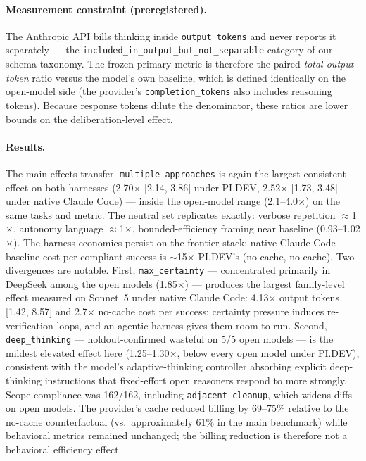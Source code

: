 \documentclass[11pt]{article}
\newcommand{\pidev}{PI.DEV}
\newcommand{\cc}{Claude Code}
\newcommand{\xd}{$\times$}
\begin{document}
\paragraph{Measurement constraint (preregistered).} The Anthropic API
bills thinking inside \texttt{output\_tokens} and never reports it
separately --- the \texttt{included\_in\_output\_but\_not\_separable}
category of our schema taxonomy. The frozen primary metric is therefore
the paired \emph{total-output-token} ratio versus the model's own
baseline, which is defined identically on the open-model side (the
provider's \texttt{completion\_tokens} also includes reasoning tokens).
Because response tokens dilute the denominator, these ratios are lower
bounds on the deliberation-level effect.

\paragraph{Results.} The main effects transfer. \texttt{multiple\_approaches}
is again the largest consistent effect on both harnesses (2.70\xd{} [2.14, 3.86]
under \pidev, 2.52\xd{} [1.73, 3.48] under native \cc) --- inside the
open-model range (2.1--4.0\xd) on the same tasks and metric. The neutral
set replicates exactly: verbose repetition $\approx$1\xd, autonomy
language $\approx$1\xd, bounded-efficiency framing near baseline (0.93--1.02\xd).
The harness economics persist on the frontier stack: native-\cc{} baseline
cost per compliant success is $\sim$15\xd{} \pidev's (no-cache,
no-cache). Two divergences are notable. First,
\texttt{max\_certainty} --- concentrated primarily in DeepSeek among the open
models (1.85\xd) --- produces the largest family-level effect measured on
Sonnet~5 under native
\cc: 4.13\xd{} output tokens [1.42, 8.57] and 2.7\xd{} no-cache cost per
success; certainty pressure induces re-verification loops, and an agentic
harness gives them room to run. Second, \texttt{deep\_thinking} ---
holdout-confirmed wasteful on 5/5 open models --- is the mildest elevated
effect here (1.25--1.30\xd, below every open model under \pidev),
consistent with the model's adaptive-thinking controller absorbing
explicit deep-thinking instructions that fixed-effort open reasoners respond
to more strongly. Scope compliance was 162/162, including
\texttt{adjacent\_cleanup}, which widens diffs on open models. The
provider's cache reduced billing by 69--75\% relative to the no-cache
counterfactual (vs.\ approximately 61\% in the main benchmark) while
behavioral metrics remained unchanged; the billing reduction is therefore
not a behavioral efficiency effect.
\end{document}
